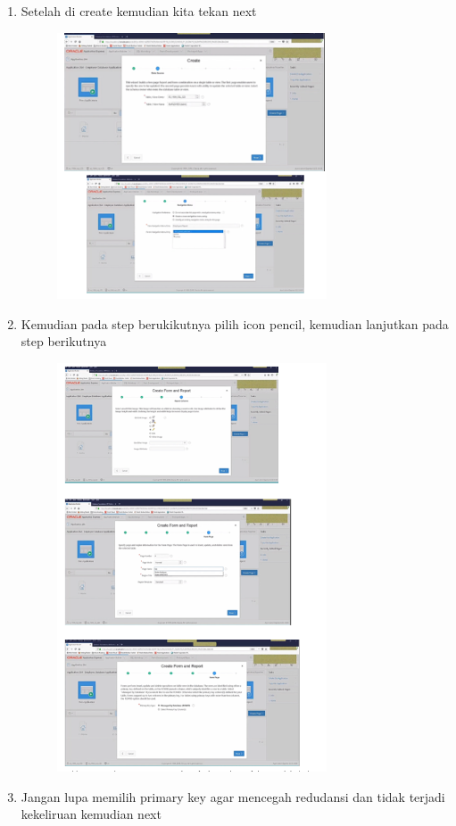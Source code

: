\documentclass{article}
\begin{document}
\begin{enumerate}
\begin{enumerate}
\begin{enumerate}
\begin{enumerate}
\begin{figure}[h]
    \end{figure}
    \item Setelah di create  kemudian kita tekan next
    \begin{figure}[h]
        \centerline{\includegraphics[width=8cm]{image/p.PNG}}
    \end{figure}
    \newpage \item Kemudian pada step berukikutnya pilih icon pencil, kemudian lanjutkan pada step berikutnya
    \begin{figure}[h]
        \centerline{\includegraphics[width=8cm]{image/q.PNG}}
    \end{figure}
    \item Jangan lupa memilih primary key agar mencegah redudansi dan tidak terjadi kekeliruan kemudian next

\end{enumerate}
\end{enumerate}
\end{enumerate}
\end{enumerate}
\end{document}
